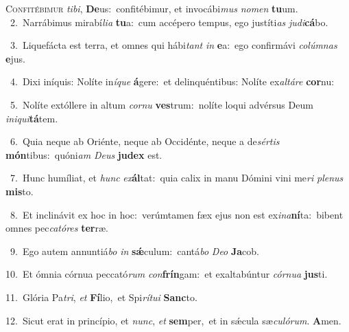 \lettrine{\initial\textcolor{\initialcolor}{C}}{onfitébimur} \textit{ti}\-\textit{bi}, \textbf{De}\-us:~\star confitébimur, et invocábi\textit{mus} \textit{no}\-\textit{men} \textbf{tu}\-um.\\
{\numbfont\textcolor{\numbcolor}{~2.}}~Narrábimus mirabí\-\textit{li}\-\textit{a} \textbf{tu}\-a:~\star cum accépero tempus, ego justíti\textit{as} \textit{ju}\-\textit{di}\textbf{cá}bo.\par
{\numbfont\textcolor{\numbcolor}{~3.}}~Liquefácta est terra, et omnes qui hábi\textit{tant} \textit{in} \textbf{e}\-a:~\star ego confirmávi \textit{co}\-\textit{lúm}\textit{nas} \textbf{e}\-jus.\par
{\numbfont\textcolor{\numbcolor}{~4.}}~Dixi iníquis: Nolíte in\-\textit{í}\-\textit{que} \textbf{á}\-gere:~\star et delinquéntibus: Nolíte ex\-\textit{al}\-\textit{tá}\textit{re} \textbf{cor}\-nu:\par
{\numbfont\textcolor{\numbcolor}{~5.}}~Nolíte extóllere in altum \textit{cor}\-\textit{nu} \textbf{ves}\-trum:~\star nolíte loqui advérsus Deum \textit{in}\-\textit{i}\textit{qui}\textbf{tá}tem.\par
{\numbfont\textcolor{\numbcolor}{~6.}}~Quia neque ab Oriénte, neque ab Occidénte, neque a de\-\textit{sér}\-\textit{tis} \textbf{món}\-tibus:~\star quóni\textit{am} \textit{De}\-\textit{us} \textbf{ju}\-\textbf{dex} est.\par
{\numbfont\textcolor{\numbcolor}{~7.}}~Hunc humíliat, et \textit{hunc} \textit{ex}\-\textbf{ál}tat:~\star quia calix in manu Dómini vini me\textit{ri} \textit{ple}\-\textit{nus} \textbf{mis}\-to.\par
{\numbfont\textcolor{\numbcolor}{~8.}}~Et inclinávit ex hoc in hoc:~\dagger verúmtamen fæx ejus non est ex\-\textit{i}\-\textit{na}\textbf{ní}ta:~\star bibent omnes pec\-\textit{ca}\-\textit{tó}\textit{res} \textbf{ter}\-ræ.\par
{\numbfont\textcolor{\numbcolor}{~9.}}~Ego autem annuntiá\textit{bo} \textit{in} \textbf{sǽ}\-culum:~\star cantá\textit{bo} \textit{De}\-\textit{o} \textbf{Ja}\-cob.\par
{\numbfont\textcolor{\numbcolor}{10.}}~Et ómnia córnua peccató\textit{rum} \textit{con}\-\textbf{frín}gam:~\star et exaltabúntur \textit{cór}\-\textit{nu}\textit{a} \textbf{jus}\-ti.\par
{\numbfont\textcolor{\numbcolor}{11.}}~Glória Pa\-\textit{tri}\-, \textit{et} \textbf{Fí}\-lio,~\star et Spi\-\textit{rí}\-\textit{tu}\textit{i} \textbf{Sanc}\-to.\par
{\numbfont\textcolor{\numbcolor}{12.}}~Sicut erat in princípio, et \textit{nunc}\-, \textit{et} \textbf{sem}\-per,~\star et in sǽcula sæ\-\textit{cu}\-\textit{ló}\textit{rum}. \textbf{A}\-men.\par
